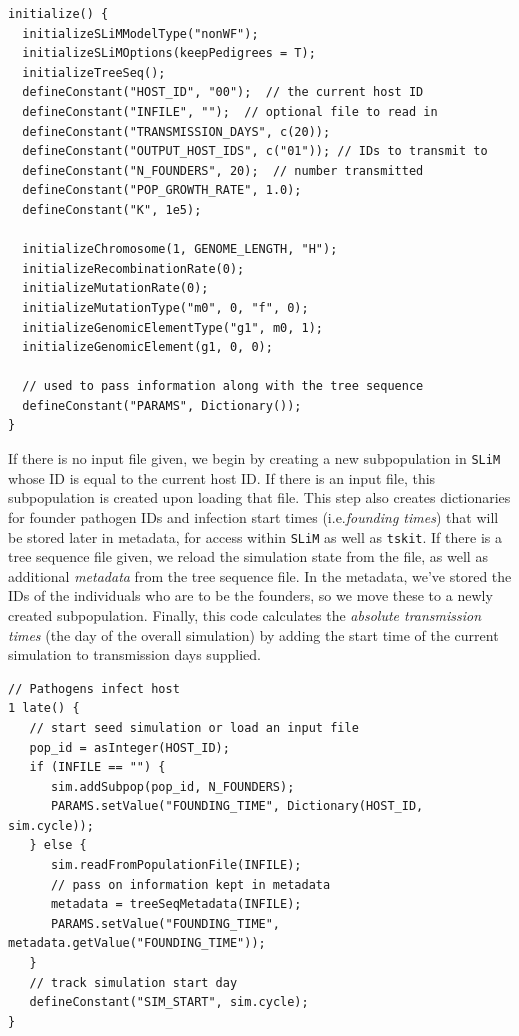 \documentclass[12pt]{article}
\newcommand{\tskit}[0]{\texttt{tskit}\xspace}
\newcommand{\slim}[0]{\texttt{SLiM}\xspace}
\newcommand*{\ie}{i.e.\xcomma}
\begin{document}
\begin{lstlisting}[language=slim, style=slimstyle, breaklines=true]
initialize() {
  initializeSLiMModelType("nonWF");
  initializeSLiMOptions(keepPedigrees = T);
  initializeTreeSeq();
  defineConstant("HOST_ID", "00");  // the current host ID
  defineConstant("INFILE", "");  // optional file to read in
  defineConstant("TRANSMISSION_DAYS", c(20));
  defineConstant("OUTPUT_HOST_IDS", c("01")); // IDs to transmit to
  defineConstant("N_FOUNDERS", 20);  // number transmitted
  defineConstant("POP_GROWTH_RATE", 1.0);
  defineConstant("K", 1e5);
  
  initializeChromosome(1, GENOME_LENGTH, "H");
  initializeRecombinationRate(0);
  initializeMutationRate(0);
  initializeMutationType("m0", 0, "f", 0);
  initializeGenomicElementType("g1", m0, 1);
  initializeGenomicElement(g1, 0, 0);

  // used to pass information along with the tree sequence
  defineConstant("PARAMS", Dictionary());
}
\end{lstlisting}

If there is no input file given,
we begin by creating a new subpopulation in \slim whose ID is equal to the current host ID.
If there is an input file, this subpopulation is created upon loading that file.
This step also creates dictionaries for founder pathogen IDs and infection start times (\ie \textit{founding times})
that will be stored later in metadata, for access within \slim as well as \tskit.
If there is a tree sequence file given,
we reload the simulation state from the file,
as well as additional \emph{metadata} from the tree sequence file.
In the metadata, we've stored the IDs of the individuals who are to be the founders,
so we move these to a newly created subpopulation.
Finally, this code
calculates the \textit{absolute transmission times} (the day of the overall simulation) by adding the start time of the current simulation to transmission days supplied.
\begin{lstlisting}[language=slim, style=slimstyle, breaklines=true]
// Pathogens infect host
1 late() {
   // start seed simulation or load an input file
   pop_id = asInteger(HOST_ID);
   if (INFILE == "") {
      sim.addSubpop(pop_id, N_FOUNDERS);
      PARAMS.setValue("FOUNDING_TIME", Dictionary(HOST_ID, sim.cycle));
   } else {
      sim.readFromPopulationFile(INFILE);
      // pass on information kept in metadata
      metadata = treeSeqMetadata(INFILE);
      PARAMS.setValue("FOUNDING_TIME", metadata.getValue("FOUNDING_TIME"));
   }
   // track simulation start day
   defineConstant("SIM_START", sim.cycle);
}
\end{lstlisting}
\end{document}
